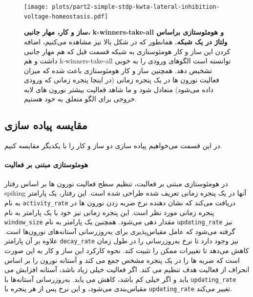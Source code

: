         \begin{figure}[!ht]
            \centering
            \texttt{[image: plots/part2-simple-stdp-kwta-lateral-inhibition-voltage-homeostasis.pdf]} 
            \captionsetup{width=.9\linewidth}
            \caption{\textbf{ ساز و کار، مهار جانبی، 
            k-winners-take-all و 
            هومئوستازی براساس ولتاژ در یک شبکه.} همانطور که در شکل بالا نیز مشاهده می‌کنیم، اضافه کردن این ساز و کار هومئوستازی به شبکه قسمت قبل که هم مهار جانبی داشت و هم 
            k-winners-take-all 
            توانسته است الگوهای ورودی را به خوبی تشخیص دهد. همچنین ساز و کار هومئوستازی باعث شده که میزان فعالیت نورون ها در یک پنجره زمانی
            (در اینجا پنجره زمانی که ورودی داده می‌شود) 
            متعادل شود و ما شاهد فعالیت بیشتر نورون های لایه خروجی برای الگو متعلق به خود هستیم.}
            \label{fig:part2-simple-stdp-kwta-lateral-inhibition-voltage-homeostasis}
        \end{figure}

        \subsection*{مقایسه پیاده سازی}
            در این قسمت می‌خواهیم پیاده سازی دو ساز و کار را با یکدیگر مقایسه کنیم.
            \paragraph*{هومئوستازی مبتنی بر فعالیت} در هومئوستازی مبتنی بر فعالیت، تنظیم سطح فعالیت نورون ها بر اساس رفتار spiking آنها در یک پنجره زمانی تعریف شده طراحی شده است. این رفتار، یک پارامتر به نام 
            \texttt{activity\_rate} 
            دریافت می‌کند که نشان دهنده نرخ ضربه زدن نورون ها در پنجره زمانی مورد نظر است. این پنجره زمانی نیز خود با یک پارامتر به نام 
            \texttt{window\_size} مقدار دهی می‌شود. 
            همچنین یک پارامتر به نام 
            \texttt{updating\_rate} 
            نیز گرفته می‌شود که عامل مقیاس‌پذیری برای به‌روزرسانی آستانه‌های نورون‌ها است. علاوه بر آن پارامتر 
            \texttt{decay\_rate} 
            نیز وجود دارد تا نرخ به‌روزرسانی را در طول زمان کاهش می‌دهد تا تغییرات ممکن را تثبیت کند.
            نحوه کارکرد این ساز و کار به این صورت است که ضربه ها را در یک پنجره مشخص جمع می کند و آستانه نورون را بر اساس انحراف از فعالیت هدف تنظیم می کند. اگر فعالیت خیلی زیاد باشد، آستانه افزایش می یابد و اگر خیلی کم باشد، کاهش می یابد. به‌روزرسانی آستانه‌ها با 
            \texttt{updating\_rate} 
            مقیاس‌بندی می‌شود، و این نرخ پس از هر پنجره با 
            \texttt{updating\_rate} 
             تغییر می‌کند.
            

